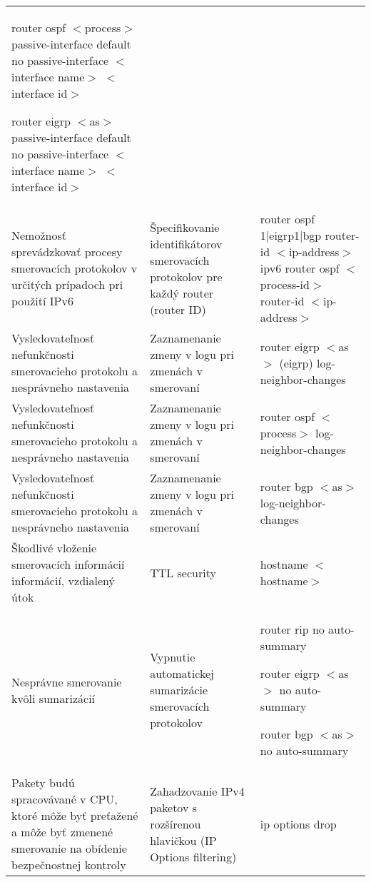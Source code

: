 \begin{longtable}[!htbp]{|L{10em}L{10em}L{34em}|}
	router ospf $<$process$>$
	passive-interface default
	no passive-interface $<$interface name$>$ $<$interface id$>$
	
	router eigrp $<$as$>$
	passive-interface default
	no passive-interface $<$interface name$>$ $<$interface id$>$\\
	
	
	
	
	Nemožnosť sprevádzkovať procesy smerovacích protokolov v určitých prípadoch pri použití IPv6	&Špecifikovanie identifikátorov smerovacích protokolov pre každý router (router ID)	&router ospf 1|eigrp1|bgp
	router-id $<$ip-address$>$ 
	ipv6 router ospf  $<$process-id$>$
	router-id $<$ip-address$>$ \\
	
	
	
	
	 Vysledovateľnosť nefunkčnosti smerovacieho protokolu a nesprávneho nastavenia	&Zaznamenanie zmeny v logu pri zmenách v smerovaní	&router eigrp $<$as$>$
	(eigrp) log-neighbor-changes\\
	
	
	
	Vysledovateľnosť nefunkčnosti smerovacieho protokolu a nesprávneho nastavenia	&Zaznamenanie zmeny v logu pri zmenách v smerovaní	&router ospf $<$process$>$
	log-neighbor-changes\\
	
	
	
	 Vysledovateľnosť nefunkčnosti smerovacieho protokolu a nesprávneho nastavenia	&Zaznamenanie zmeny v logu pri zmenách v smerovaní	&router bgp $<$as$>$
	log-neighbor-changes\\
	
	
	
	Škodlivé vloženie smerovacích informácií informácií, vzdialený útok	&TTL security	&hostname $<$hostname$>$\\
	
	
	
	 Nesprávne smerovanie kvôli sumarizácií	&Vypnutie automatickej sumarizácie smerovacích protokolov	&router rip
	no auto-summary
	
	router eigrp $<$as$>$
	no auto-summary
	
	router bgp $<$as$>$
	no auto-summary\\
	
	
	
	
	Pakety budú spracovávané v CPU, ktoré môže byť preťažené a môže byť zmenené smerovanie na obídenie bezpečnostnej kontroly	&Zahadzovanie IPv4 paketov s rozšírenou hlavičkou (IP Options filtering)	&ip options drop\\
	

\end{longtable}

